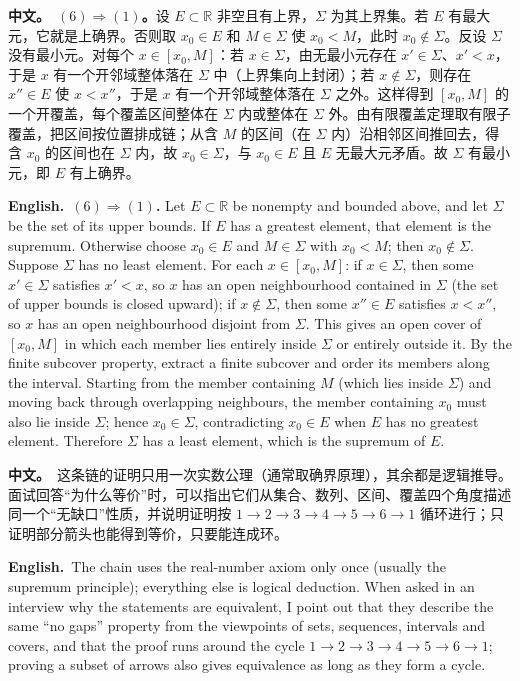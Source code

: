 \documentclass[UTF8,11pt,a4paper]{ctexart}
\newcommand{\BOTH}[2]{\par\noindent\textbf{中文。}\ #1\par\noindent\textbf{English.}\ #2\par}
\begin{document}
\BOTH{\textbf{$(6)\Rightarrow(1)$。}设 $E\subset\mathbb R$ 非空且有上界，$\Sigma$ 为其上界集。若 $E$ 有最大元，它就是上确界。否则取 $x_0\in E$ 和 $M\in\Sigma$ 使 $x_0<M$，此时 $x_0\notin\Sigma$。反设 $\Sigma$ 没有最小元。对每个 $x\in[x_0,M]$：若 $x\in\Sigma$，由无最小元存在 $x'\in\Sigma$、$x'<x$，于是 $x$ 有一个开邻域整体落在 $\Sigma$ 中（上界集向上封闭）；若 $x\notin\Sigma$，则存在 $x''\in E$ 使 $x<x''$，于是 $x$ 有一个开邻域整体落在 $\Sigma$ 之外。这样得到 $[x_0,M]$ 的一个开覆盖，每个覆盖区间整体在 $\Sigma$ 内或整体在 $\Sigma$ 外。由有限覆盖定理取有限子覆盖，把区间按位置排成链；从含 $M$ 的区间（在 $\Sigma$ 内）沿相邻区间推回去，得含 $x_0$ 的区间也在 $\Sigma$ 内，故 $x_0\in\Sigma$，与 $x_0\in E$ 且 $E$ 无最大元矛盾。故 $\Sigma$ 有最小元，即 $E$ 有上确界。}{\textbf{$(6)\Rightarrow(1)$.} Let $E\subset\mathbb R$ be nonempty and bounded above, and let $\Sigma$ be the set of its upper bounds. If $E$ has a greatest element, that element is the supremum. Otherwise choose $x_0\in E$ and $M\in\Sigma$ with $x_0<M$; then $x_0\notin\Sigma$. Suppose $\Sigma$ has no least element. For each $x\in[x_0,M]$: if $x\in\Sigma$, then some $x'\in\Sigma$ satisfies $x'<x$, so $x$ has an open neighbourhood contained in $\Sigma$ (the set of upper bounds is closed upward); if $x\notin\Sigma$, then some $x''\in E$ satisfies $x<x''$, so $x$ has an open neighbourhood disjoint from $\Sigma$. This gives an open cover of $[x_0,M]$ in which each member lies entirely inside $\Sigma$ or entirely outside it. By the finite subcover property, extract a finite subcover and order its members along the interval. Starting from the member containing $M$ (which lies inside $\Sigma$) and moving back through overlapping neighbours, the member containing $x_0$ must also lie inside $\Sigma$; hence $x_0\in\Sigma$, contradicting $x_0\in E$ when $E$ has no greatest element. Therefore $\Sigma$ has a least element, which is the supremum of $E$.}
\BOTH{这条链的证明只用一次实数公理（通常取确界原理），其余都是逻辑推导。面试回答“为什么等价”时，可以指出它们从集合、数列、区间、覆盖四个角度描述同一个“无缺口”性质，并说明证明按 $1\to2\to3\to4\to5\to6\to1$ 循环进行；只证明部分箭头也能得到等价，只要能连成环。}{The chain uses the real-number axiom only once (usually the supremum principle); everything else is logical deduction. When asked in an interview why the statements are equivalent, I point out that they describe the same “no gaps” property from the viewpoints of sets, sequences, intervals and covers, and that the proof runs around the cycle $1\to2\to3\to4\to5\to6\to1$; proving a subset of arrows also gives equivalence as long as they form a cycle.}
\end{document}
